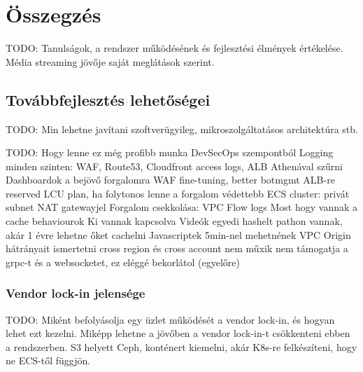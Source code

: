 \chapter{Összegzés}

TODO: Tanulságok, a rendszer működésének és fejlesztési élmények értékelése. Média streaming jövője saját meglátások szerint.

\section{Továbbfejlesztés lehetőségei}

TODO: Min lehetne javítani szoftverügyileg, mikroszolgáltatásos architektúra stb.

TODO: Hogy lenne ez még profibb munka DevSecOps szempontból
Logging minden szinten: WAF, Route53, Cloudfront access logs, ALB
Athenával szűrni
Dashboardok a bejövő forgalomra
WAF fine-tuning, better botmgmt
ALB-re reserved LCU plan, ha folytonos lenne a forgalom
védettebb ECS cluster: privát subnet
NAT gatewayjel
Forgalom csekkolása: VPC Flow logs
Most hogy vannak a cache behaviourok
Ki vannak kapcsolva
Videók egyedi hashelt pathon vannak, akár 1 évre lehetne őket cachelni
Javascriptek 5min-nel mehetnének
VPC Origin hátrányait ismertetni
cross region és cross account nem műxik
nem támogatja a grpc-t és a websocketet, ez eléggé bekorlátol (egyelőre)

\subsection{Vendor lock-in jelensége}

TODO: Miként befolyásolja egy üzlet működését a vendor lock-in, és hogyan lehet ezt kezelni. Miképp lehetne a jövőben a vendor lock-in-t csökkenteni ebben a rendszerben. S3 helyett Ceph, konténert kiemelni, akár K8s-re felkészíteni, hogy ne ECS-től függjön.
